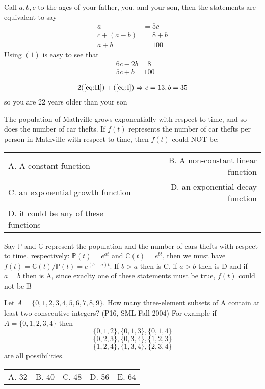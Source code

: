 \documentclass[12pt]{article}
\makeatletter
\newcounter{problem}
\newcommand{\multChoice}[5]{
    \begin{tabular}{l @{\hskip 1.5cm} l @{\hskip 1.5cm} l @{\hskip 1.5cm} l @{\hskip 1.5cm} l}
    A. #1 & B. #2 & C. #3 & D. #4 & E. #5
\end{tabular}

}
\makeatother
\begin{document}
\begin{spacing}{1.3}
\begin{solution}[D]
   Call $a,b,c$ to the ages of your father, you, and your son, then the statements are
    equivalent to say 
    \begin{align}
       a &= 5c \tag{1} \label{eq:1}\\
       c + (a-b) &= 8+b \tag{2} \label{eq:2}\\
       a+b &= 100 \tag{3} \label{eq:3}
    \end{align}
    Using $(1)$ is easy to see that
    \begin{align}
       &6c-2b = 8 \tag{I} \label{eq:I}\\
       &5c+b = 100 \tag{II} \label{eq:II}
    \end{align}

    \begin{align*}
        2(\ref{eq:II})+(\ref{eq:I}) \Rightarrow c=13,b=35 
    \end{align*}
    so you are 22 years older than your son
\end{solution}

\begin{problem}
      The population of Mathville grows exponentially with respect to time, and so does the number
      of car thefts. If $f(t)$ represents the number of car thefts per person in Mathville with respect to time,
      then $f(t)$ could NOT be: 
      \begin{tabular}{l r}
         A. A constant function & B. A non-constant linear function  \\
         C. an exponential growth function & D. an exponential decay function\\
         D. it could be any of these functions
         \end{tabular}
\end{problem}

\begin{solution}[B]
   Say $\mathbb{P}$ and $\mathbb{C}$ represent the population and the number of cars thefts
    with respect to time, respectively: $\mathbb{P}(t)=e^{at}$ and $\mathbb{C}(t)=e^{bt}$, 
    then we must have $f(t) = \mathbb{C}(t) / \mathbb{P}(t) = e^{(b-a)t}$.
    If $b>a$ then is C, if $a>b$ then is D and if $a=b$ then is A, since exaclty one of these statements
    must be true, $f(t)$ could not be B

\end{solution}

\begin{problem}
      Let $A = \{0,1,2,3,4,5,6,7,8,9\}$. How many three-element subsets of A contain at least two
      consecutive integers? (P16, SML Fall 2004) 
      For example if $A = \{0,1,2,3,4\}$ then
      $$  \{0,1,2\} , \{0,1,3\} , \{0,1,4\}$$ 
      $$  \{0,2,3\} , \{0,3,4\} , \{1,2,3\}$$
      $$  \{1,2,4\} , \{1,3,4\} , \{2,3,4\}$$
      are all possibilities. \\
\multChoice{32}{40}{48}{56}{64}
\end{problem}


\end{spacing}
\end{document}
